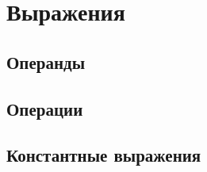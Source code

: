 \hypertarget{expressions}{%
\section{Выражения}\label{expr:chapter}}

\hypertarget{operands}{%
\subsection{Операнды}\label{expr:operands}}

\hypertarget{operators}{%
\subsection{Операции}\label{expr:operators}}

\hypertarget{const-expr}{%
\subsection{Константные выражения}\label{expr:const-expr}}